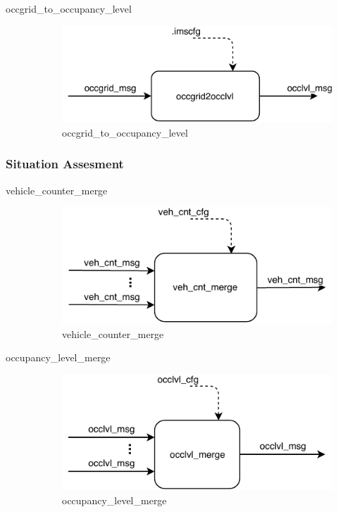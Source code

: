 \begin{description}
\item[occgrid\_to\_occupancy\_level] \hfill
\begin{figure}[ht!]
\centering
\includegraphics[scale=1]{fig/3/occgrid2occlvl.pdf}
\caption{occgrid\_to\_occupancy\_level}
\label{occgrid_to_occupancy_level}
\end{figure}

\end{description}

\subsubsection{Situation Assesment}
\begin{description}

\item[vehicle\_counter\_merge] \hfill
\begin{figure}[ht!]
\centering
\includegraphics[scale=1]{fig/3/veh_cnt_merge.pdf}
\caption{vehicle\_counter\_merge}
\label{vehicle_counter_merge}
\end{figure}

\item[occupancy\_level\_merge] \hfill
\begin{figure}[ht!]
\centering
\includegraphics[scale=1]{fig/3/occlvl_merge.pdf}
\caption{occupancy\_level\_merge}
\label{occupancy_level_merge}
\end{figure}

\end{description}

